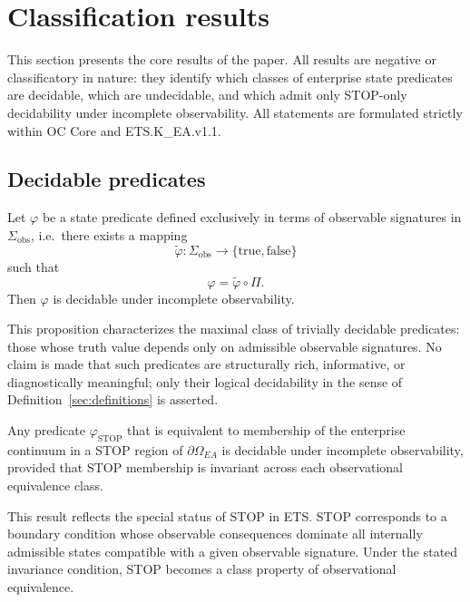 \section{Classification results}
\label{sec:classification}

This section presents the core results of the paper. All results are
negative or classificatory in nature: they identify which classes of
enterprise state predicates are decidable, which are undecidable, and
which admit only STOP-only decidability under incomplete observability.
All statements are formulated strictly within OC Core and
ETS.K\_EA.v1.1.

\subsection{Decidable predicates}
\label{subsec:decidable-predicates}

\begin{proposition}
\label{prop:observational-invariance}
Let $\varphi$ be a state predicate defined exclusively in terms of
observable signatures in $\Sigma_{\mathrm{obs}}$, i.e.\ there exists a
mapping
\[
\tilde{\varphi} : \Sigma_{\mathrm{obs}} \to \{\text{true},\text{false}\}
\]
such that
\[
\varphi = \tilde{\varphi} \circ \Pi.
\]
Then $\varphi$ is decidable under incomplete observability.
\end{proposition}

\noindent
This proposition characterizes the maximal class of trivially decidable
predicates: those whose truth value depends only on admissible observable
signatures. No claim is made that such predicates are structurally rich,
informative, or diagnostically meaningful; only their logical
decidability in the sense of Definition~\ref{sec:definitions} is
asserted.

\begin{theorem}
\label{thm:stop-decidability}
Any predicate $\varphi_{\mathrm{STOP}}$ that is equivalent to membership
of the enterprise continuum in a STOP region of
$\partial\Omega_{EA}$ is decidable under incomplete observability,
provided that STOP membership is invariant across each observational
equivalence class.
\end{theorem}

\noindent
This result reflects the special status of STOP in ETS. STOP corresponds
to a boundary condition whose observable consequences dominate all
internally admissible states compatible with a given observable
signature. Under the stated invariance condition, STOP becomes a class
property of observational equivalence.

